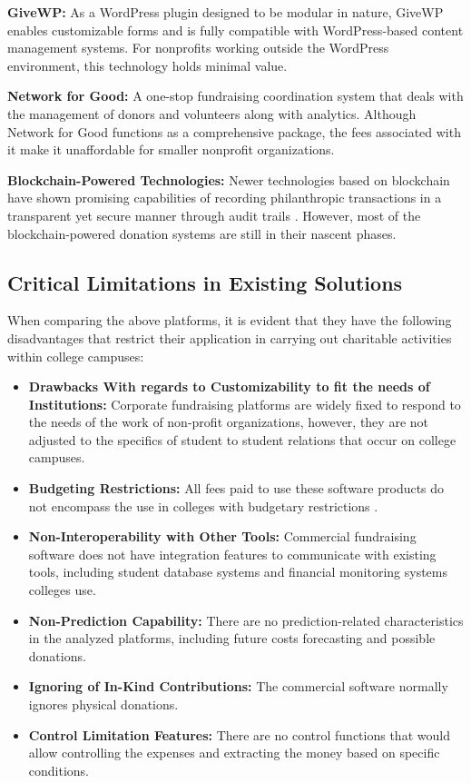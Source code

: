 \documentclass{thesis-library}
\begin{document}
\textbf{GiveWP:} As a WordPress plugin designed to be modular in nature, GiveWP enables customizable forms and is fully compatible with WordPress-based content management systems. For nonprofits working outside the WordPress environment, this technology holds minimal value.

\textbf{Network for Good:} A one-stop fundraising coordination system that deals with the management of donors and volunteers along with analytics. Although Network for Good functions as a comprehensive package, the fees associated with it make it unaffordable for smaller nonprofit organizations.

\textbf{Blockchain-Powered Technologies:} Newer technologies based on blockchain have shown promising capabilities of recording philanthropic transactions in a transparent yet secure manner through audit trails \cite{huang2020online}. However, most of the blockchain-powered donation systems are still in their nascent phases.


\subsection{Critical Limitations in Existing Solutions}

When comparing the above platforms, it is evident that they have the following disadvantages that restrict their application in carrying out charitable activities within college campuses:

\begin{itemize}
    \item \textbf{Drawbacks With regards to Customizability to fit the needs of Institutions:} Corporate fundraising platforms are widely fixed to respond to the needs of the work of non-profit organizations, however, they are not adjusted to the specifics of student to student relations that occur on college campuses.
    \item \textbf{Budgeting Restrictions:} All fees paid to use these software products do not encompass the use in colleges with budgetary restrictions \cite{sanchez2019framework}.
    \item \textbf{Non-Interoperability with Other Tools:} Commercial fundraising software does not have integration features to communicate with existing tools, including student database systems and financial monitoring systems colleges use.
    \item \textbf{Non-Prediction Capability:} There are no prediction-related characteristics in the analyzed platforms, including future costs forecasting and possible donations.
    \item \textbf{Ignoring of In-Kind Contributions:} The commercial software normally ignores physical donations.
    \item \textbf{Control Limitation Features:} There are no control functions that would allow controlling the expenses and extracting the money based on specific conditions.
\end{itemize}
\end{document}

